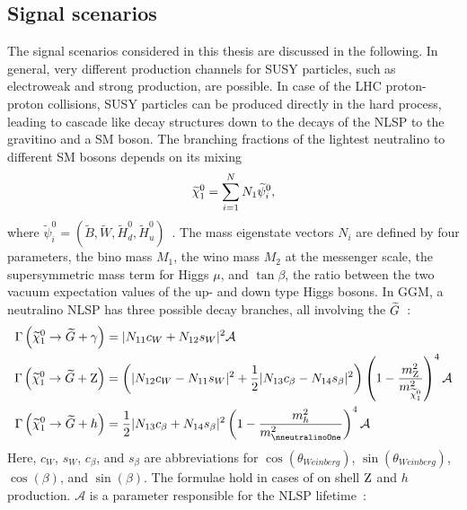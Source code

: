 \subsection{Signal scenarios}\label{sec:SMS}
The signal scenarios considered in this thesis are discussed in the following. In general, very different production channels for SUSY particles, such as electroweak and strong production, are possible. In case of the LHC proton-proton collisions, SUSY particles can be produced directly in the hard process, leading to cascade like decay structures down to the decays of the NLSP to the gravitino and a SM boson. The branching fractions of the lightest neutralino to different SM bosons depends on its mixing
\begin{equation}
 \widetilde{\chi}^{0}_{1} = \sum_{i=1}^{N} N_{1} \widetilde{\psi}_i^0,
\end{equation}
where $\widetilde{\psi}_i^0=(\widetilde{B},\widetilde{W},\widetilde{H}_d^0,\widetilde{H}_u^0)$~\cite{NLSPDecay}. The mass eigenstate vectors $N_i$ are defined by four parameters, the bino mass $M_1$, the wino mass $M_2$ at the messenger scale, the supersymmetric mass term for Higgs $\mu$, and $\tan{\beta}$, the ratio between the two vacuum expectation values of the up- and down type Higgs bosons. In GGM, a neutralino NLSP has three possible decay branches, all involving the $\widetilde{G}$~\cite{NLSPDecay}:
\begin{align}
 \Gamma\left(\neutralinoOne\to\gravitino+\PGg\right) & = |N_{11}c_W+N_{12}s_W|^2 \mathcal{A}                                                                                                                       \\
 \Gamma\left(\neutralinoOne\to\gravitino+\PZ\right)  & = \left(|N_{12}c_W - N_{11}s_W|^2 +\frac{1}{2}|N_{13}c_{\beta}-N_{14}s_{\beta}|^2\right)\left(1-\frac{m_{\PZ}^2}{m_{\neutralinoOne}^2}\right)^4 \mathcal{A} \\
 \Gamma\left(\neutralinoOne\to\gravitino+h\right)    & = \frac{1}{2}|N_{13}c_{\beta}+N_{14}s_{\beta}|^2\left(1-\frac{m_h^2}{m_{\nneutralinoOne}^2}\right)^4 \mathcal{A}                                            
\end{align}
Here, $c_W$, $s_W$, $c_\beta$, and $s_\beta$ are abbreviations for $\cos(\theta_{Weinberg})$, $\sin(\theta_{Weinberg})$, $\cos(\beta)$, and $\sin(\beta)$. The formulae hold in cases of on shell $\mathrm{Z}$ and $h$ production. $\mathcal{A}$ is a parameter responsible for the NLSP lifetime~\cite{NLSP1,NLSP2}:
